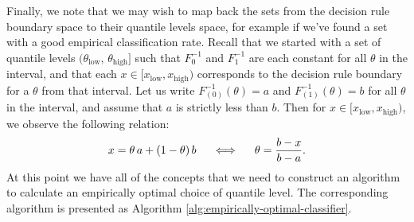 \documentclass{article}
\begin{document}
Finally, we note that we may wish to map back the sets from the decision rule
boundary space to their quantile levels space, for example if we've found a set
with a good empirical classification rate.  Recall that we started with a set of
quantile levels
$(\theta_{\scriptscriptstyle\text{low}},\,
\theta_{\scriptscriptstyle\text{high}}]$ such that $F_{0}^{-1}$ and $F_{1}^{-1}$
are each constant for all $\theta$ in the interval, and that each
$x \in [x_{\scriptscriptstyle\text{low}}, x_{\scriptscriptstyle\text{high}})$
corresponds to the decision rule boundary for a $\theta$ from that interval.
Let us write $F_{(0)}^{-1}(\theta) = a$ and $F_{(1)}^{-1}(\theta) = b$ for all
$\theta$ in the interval, and assume that $a$ is strictly less than $b$.  Then
for
$x \in [x_{\scriptscriptstyle\text{low}}, x_{\scriptscriptstyle\text{high}})$,
we observe the following relation:
\begin{equation}
  \label{eq:map-to-quantile}
  x = \theta\, a + (1 - \theta)\, b
  \hspace{5mm} \Longleftrightarrow \hspace{5mm}
  \theta = \frac{b - x}{b - a}.
\end{equation}
At this point we have all of the concepts that we need to construct an algorithm
to calculate an empirically optimal choice of quantile level.  The corresponding
algorithm is presented as Algorithm \ref{alg:empirically-optimal-classifier}.
\end{document}
